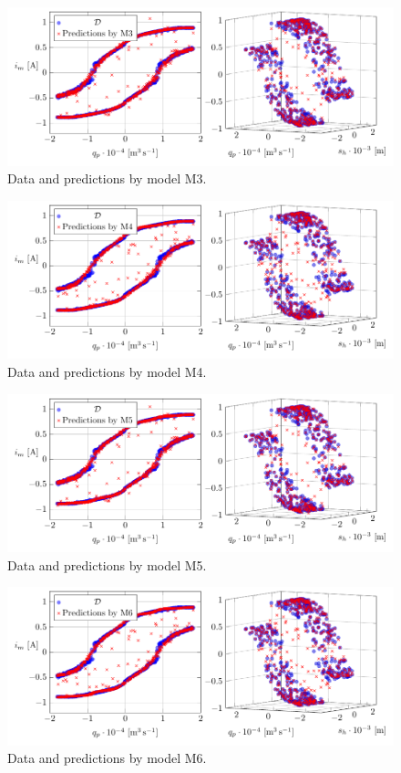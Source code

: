 \begin{figure}[H]
	\centering 
	\includegraphics{graphics/pgfplots/cha5/Bosch/M3.pdf}
	\caption{Data and predictions by model M3.}
	\label{fig:bosch-M3}
\end{figure}

\begin{figure}[H]
	\centering 
	\includegraphics{graphics/pgfplots/cha5/Bosch/M4.pdf}
	\caption{Data and predictions by model M4.}
	\label{fig:bosch-M4}
\end{figure}

\begin{figure}[H]
	\centering 
	\includegraphics{graphics/pgfplots/cha5/Bosch/M5.pdf}
	\caption{Data and predictions by model M5.}
	\label{fig:bosch-M5}
\end{figure}

\begin{figure}[H]
	\centering 
	\includegraphics{graphics/pgfplots/cha5/Bosch/M6.pdf}
	\caption{Data and predictions by model M6.}
	\label{fig:bosch-M6}
\end{figure}

